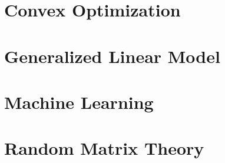 \documentclass{prettybook}
\begin{document}
\part{Convex Optimization}





\part{Generalized Linear Model}







\part{Machine Learning}






\part{Random Matrix Theory}


\appendix

\nocite{*}
\printbibliography
\end{document}
